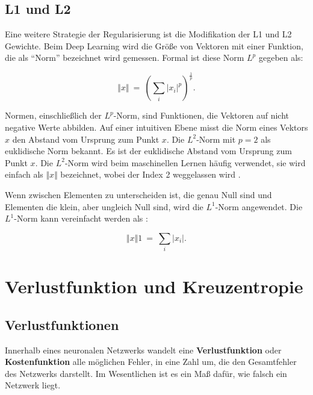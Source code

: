         \subsection{L1 und L2}
        Eine weitere Strategie der Regularisierung ist die Modifikation der L1 und L2 Gewichte. Beim Deep Learning wird die Größe von Vektoren mit einer Funktion, die als \enquote{Norm} bezeichnet wird \cite*[39]{IanGoodfellowYoshuaBengio2016} gemessen. Formal ist diese Norm $L^p$ gegeben als:

        \begin{equation} \label{FormelNorm2}
            \Vert x\Vert \ =\ \left(\sum _{i}\bigr| x_{i}\bigr|^{p}\right)^{\frac{1}{p}}.
        \end{equation}

        Normen, einschließlich der $L^p$-Norm, sind Funktionen, die Vektoren auf nicht negative Werte abbilden. Auf einer intuitiven Ebene misst die Norm eines Vektors $x$ den Abstand vom Ursprung zum Punkt $x$. Die $L^2$-Norm mit $p = 2$ als euklidische Norm bekannt. Es ist der euklidische Abstand vom Ursprung zum Punkt $x$. Die $L^2$-Norm wird beim maschinellen Lernen häufig verwendet, sie wird einfach als $\Vert x\Vert$ bezeichnet, wobei der Index 2 weggelassen wird \cite*[39]{IanGoodfellowYoshuaBengio2016}.

        Wenn zwischen Elementen zu unterscheiden ist, die genau Null sind und Elementen die klein, aber ungleich Null sind, wird die $L^1$-Norm angewendet. Die $L^1$-Norm kann vereinfacht werden als \cite*[40]{IanGoodfellowYoshuaBengio2016}:

        \begin{equation} \label{FormelNorm1}
            \Vert x\Vert 1\ =\ \sum _{i}\bigr| x_{i}\bigr|.
        \end{equation}


        \section{Verlustfunktion und Kreuzentropie}
        \subsection{Verlustfunktionen}
        Innerhalb eines neuronalen Netzwerks wandelt eine \textbf{Verlustfunktion} oder \textbf{Kostenfunktion} alle möglichen Fehler, in eine Zahl um, die den Gesamtfehler des Netzwerks darstellt. Im Wesentlichen ist es ein Maß dafür, wie falsch ein Netzwerk liegt.

